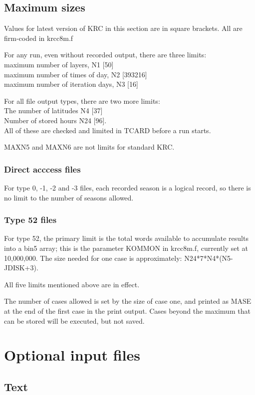 \documentclass{article}
\newcommand{\qi}{\\ \hspace*{2.em}}      %
\begin{document}
\subsection{Maximum sizes} %
Values for latest version of KRC in this section are in square brackets. All are
firm-coded in krcc8m.f

For any run, even without recorded output, there are three limits:
\qi maximum number of layers, N1 [50]  
\qi maximum number of times of day, N2 [393216]
\qi maximum number of iteration days, N3 [16]

For all file output types, there are two more limits:
\qi The number of latitudes N4 [37] 
\qi  Number of stored hours N24 [96]. 
\\ All of these are checked and limited in TCARD before a run starts.

MAXN5 and MAXN6 are not limits for standard KRC.

\subsubsection{Direct acccess files} %
For type 0, -1, -2 and -3 files, each recorded season is a logical record, so
there is no limit to the number of seasons allowed.

\subsubsection{Type 52 files} %

For type 52, the primary limit is the total words available to accumulate
results into a bin5 array; this is the parameter KOMMON in krcc8m.f, currently
set at 10,000,000. The size needed for one case is approximately:  
N24*7*N4*(N5-JDISK+3).

All five limits mentioned above are in effect.

The number of cases allowed is set by the size of case one, and printed as MASE
at the end of the first case in the print output. Cases beyond the maximum that
can be stored will be executed, but not saved.

\section{Optional input files} %
\subsection{Text}
\end{document}
